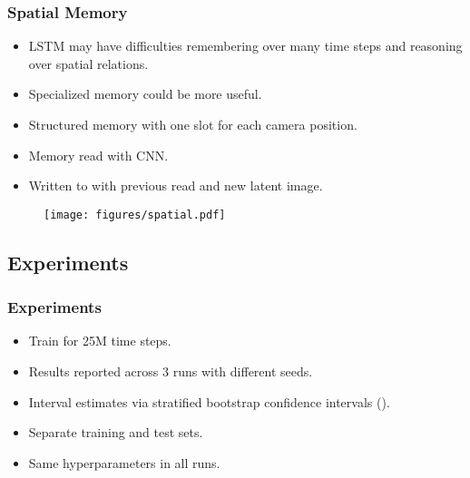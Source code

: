\begin{frame}
    \frametitle{Spatial Memory}

    \begin{itemize}
        \item LSTM may have difficulties remembering over many time steps and reasoning over spatial relations.
        \item Specialized memory could be more useful.
        \item Structured memory with one slot for each camera position.
        \item Memory read with CNN.
        \item Written to with previous read and new latent image.
    \end{itemize}

    \begin{figure}
        \centering
        \texttt{[image: figures/spatial.pdf]}
    \end{figure}
\end{frame}

\subsection{Experiments}

\begin{frame}
    \frametitle{Experiments}

    \begin{itemize}
        \item Train for 25M time steps.
        \item Results reported across 3 runs with different seeds.
        \item Interval estimates via stratified bootstrap confidence intervals (\cite{agarwal_rlliable_2022}).
        \item Separate training and test sets.
        \item Same hyperparameters in all runs.
    \end{itemize}
\end{frame}


